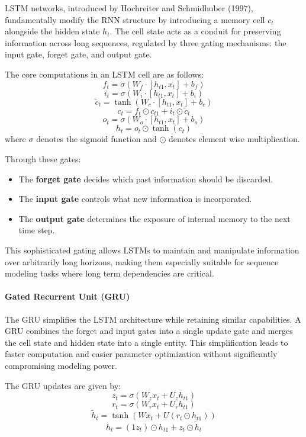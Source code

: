 \documentclass{article}
\begin{document}
LSTM networks, introduced by Hochreiter and Schmidhuber (1997), fundamentally modify the RNN structure by introducing a memory cell \(c_t\) alongside the hidden state \(h_t\). The cell state acts as a conduit for preserving information across long sequences, regulated by three gating mechanisms: the input gate, forget gate, and output gate\cite{sherstinsky_fundamentals}.

The core computations in an LSTM cell are as follows:
\[
f_t = \sigma(W_f \cdot [h_{t 1}, x_t] + b_f)
\]
\[
i_t = \sigma(W_i \cdot [h_{t 1}, x_t] + b_i)
\]
\[
\tilde{c}_t = \tanh(W_c \cdot [h_{t 1}, x_t] + b_c)
\]
\[
c_t = f_t \odot c_{t 1} + i_t \odot \tilde{c}_t
\]
\[
o_t = \sigma(W_o \cdot [h_{t 1}, x_t] + b_o)
\]
\[
h_t = o_t \odot \tanh(c_t)
\]
where \(\sigma\) denotes the sigmoid function and \(\odot\) denotes element wise multiplication.

Through these gates:
\begin{itemize}
    \item The \textbf{forget gate} decides which past information should be discarded.
    \item The \textbf{input gate} controls what new information is incorporated.
    \item The \textbf{output gate} determines the exposure of internal memory to the next time step.
\end{itemize}

This sophisticated gating allows LSTMs to maintain and manipulate information over arbitrarily long horizons, making them especially suitable for sequence modeling tasks where long term dependencies are critical.

\paragraph{Gated Recurrent Unit (GRU)}

The GRU simplifies the LSTM architecture while retaining similar capabilities. A GRU combines the forget and input gates into a single update gate and merges the cell state and hidden state into a single entity. This simplification leads to faster computation and easier parameter optimization without significantly compromising modeling power\cite{salem_2021_gated}.

The GRU updates are given by:
\[
z_t = \sigma(W_z x_t + U_z h_{t 1})
\]
\[
r_t = \sigma(W_r x_t + U_r h_{t 1})
\]
\[
\tilde{h}_t = \tanh(W x_t + U (r_t \odot h_{t 1}))
\]
\[
h_t = (1   z_t) \odot h_{t 1} + z_t \odot \tilde{h}_t
\]
\end{document}
